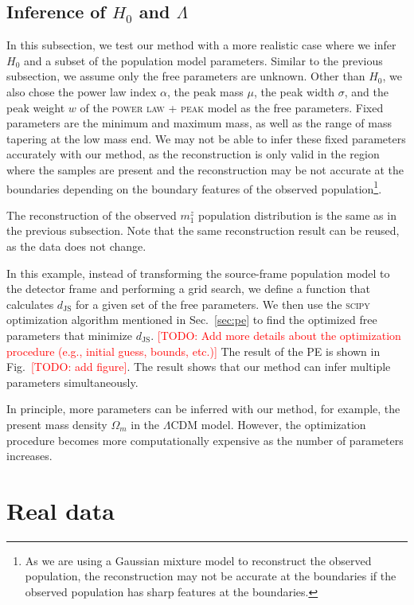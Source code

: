 \documentclass[twocolumn]{aastex631}
\newcommand{\todo}[1]{\textcolor{red}{[TODO: #1]}}
\begin{document}
\subsection{Inference of $H_0$ and $\Lambda$}
\label{sec:inference_multi}

In this subsection, we test our method with a more realistic case where we infer $H_0$ and a subset of the population model parameters.
Similar to the previous subsection, we assume only the free parameters are unknown.
Other than $H_0$, we also chose the power law index $\alpha$, the peak mass $\mu$, the peak width $\sigma$, and the peak weight $w$ of the \textsc{power law + peak} model as the free parameters.
Fixed parameters are the minimum and maximum mass, as well as the range of mass tapering at the low mass end.
We may not be able to infer these fixed parameters accurately with our method, as the reconstruction is only valid in the region where the samples are present and the reconstruction may be not accurate at the boundaries depending on the boundary features of the observed population\footnote{As we are using a Gaussian mixture model to reconstruct the observed population, the reconstruction may not be accurate at the boundaries if the observed population has sharp features at the boundaries.}.

The reconstruction of the observed $m^z_1$ population distribution is the same as in the previous subsection.
Note that the same reconstruction result can be reused, as the data does not change.

In this example, instead of transforming the source-frame population model to the detector frame and performing a grid search, we define a function that calculates $d_\mathrm{JS}$ for a given set of the free parameters.
We then use the \textsc{scipy} optimization algorithm mentioned in Sec.~\ref{sec:pe} to find the optimized free parameters that minimize $d_\mathrm{JS}$.
\todo{Add more details about the optimization procedure (e.g., initial guess, bounds, etc.)}
The result of the \ac{PE} is shown in Fig.~\todo{add figure}.
The result shows that our method can infer multiple parameters simultaneously.

In principle, more parameters can be inferred with our method, for example, the present mass density $\Omega_m$ in the $\Lambda$CDM model.
However, the optimization procedure becomes more computationally expensive as the number of parameters increases.

\section{Real data}
\label{sec:real_data}
\end{document}
